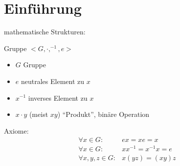 \section{Einführung}
mathematische Strukturen:\\
\begin{definition}
	Gruppe $<G,\cdot, ^{-1},e>$
	\begin{itemize}
		\item $G$ Gruppe
		\item $e$ neutrales Element zu $x$
		\item $x^{-1}$ inverses Element zu $x$
		\item $x\cdot y$ (meist $xy$) ``Produkt'', binäre Operation
	\end{itemize}
	Axiome:
	\begin{align*}
		\forall x \in G \colon& ex = xe = x\\
		\forall x \in G \colon& x x^{-1} = x^{-1}x = e\\
		\forall x,y,z \in G \colon& x(yz) = (xy)z
	\end{align*}
\end{definition}
